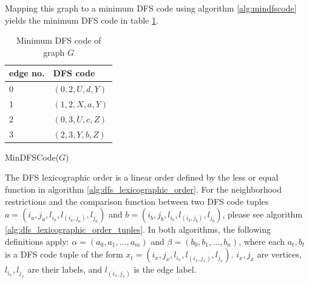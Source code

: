 \documentclass[pdftex,12pt,a4paper]{report}
\begin{document}
Mapping this graph to a minimum DFS code using algorithm \ref{alg:mindfscode} yields the minimum DFS code in table \ref{table:dummy_min_dfs_codes}.
\begin{table}[h]
	\centering
	\caption{Minimum DFS code of graph $G$}
	\label{table:dummy_min_dfs_codes}
	\begin{tabular}{l|l}
		edge no. & DFS code          \\ \hline
		0        & $(0,2,U,d,Y)$     \\
		1        & $(1, 2, X, a, Y)$ \\
		2        & $(0, 3, U, c,Z)$  \\
		3        & $(2, 3, Y, b, Z)$
	\end{tabular}
\end{table}

\begin{algorithm}
	\caption{MinDFSCode($G$)}\label{alg:mindfscode}
	\begin{algorithmic}[1]
		\EndFor
	\end{algorithmic}
\end{algorithm}
The DFS lexicographic order is a linear order defined by the less or equal function in algorithm \ref{alg:dfs_lexicographic_order}. For the neighborhood restrictions and the comparison function between two DFS code tuples $a = (i_a, j_a, l_{i_a}, l_{(i_a, j_a)}, l_{j_a})$ and $b = (i_b, j_b, l_{i_b}, l_{(i_b, j_b)}, l_{j_b})$, please see algorithm \ref{alg:dfs_lexicographic_order_tuples}. In both algorithms, the following definitions apply: $\alpha = (a_0, a_1, ..., a_m)$ and $\beta = (b_0, b_1, ..., b_n)$, where each $a_t, b_t$ is a DFS code tuple of the form $x_t = (i_x, j_x, l_{i_x}, l_{(i_x, j_x)}, l_{j_x})$. $i_x, j_x$ are vertices, $l_{i_x}, l_{j_x}$ are their labels, and $l_{(i_x, j_x)}$ is the edge label.
\end{document}
